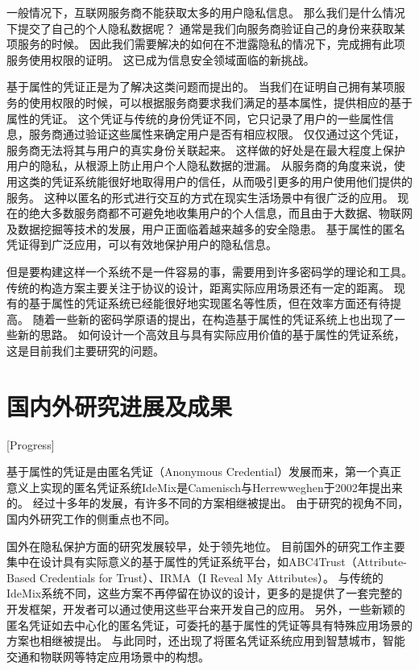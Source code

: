 一般情况下，互联网服务商不能获取太多的用户隐私信息。
那么我们是什么情况下提交了自己的个人隐私数据呢？
通常是我们向服务商验证自己的身份来获取某项服务的时候。
因此我们需要解决的如何在不泄露隐私的情况下，完成拥有此项服务使用权限的证明。
这已成为信息安全领域面临的新挑战。

基于属性的凭证正是为了解决这类问题而提出的。
当我们在证明自己拥有某项服务的使用权限的时候，可以根据服务商要求我们满足的基本属性，提供相应的基于属性的凭证。
这个凭证与传统的身份凭证不同，它只记录了用户的一些属性信息，服务商通过验证这些属性来确定用户是否有相应权限。
仅仅通过这个凭证，服务商无法将其与用户的真实身份关联起来。
这样做的好处是在最大程度上保护用户的隐私，从根源上防止用户个人隐私数据的泄漏。
从服务商的角度来说，使用这类的凭证系统能很好地取得用户的信任，从而吸引更多的用户使用他们提供的服务。
这种以匿名的形式进行交互的方式在现实生活场景中有很广泛的应用。
现在的绝大多数服务商都不可避免地收集用户的个人信息，而且由于大数据、物联网及数据挖掘等技术的发展，用户正面临着越来越多的安全隐患。
基于属性的匿名凭证得到广泛应用，可以有效地保护用户的隐私信息。

但是要构建这样一个系统不是一件容易的事，需要用到许多密码学的理论和工具。
传统的构造方案主要关注于协议的设计，距离实际应用场景还有一定的距离。
现有的基于属性的凭证系统已经能很好地实现匿名等性质，但在效率方面还有待提高。
随着一些新的密码学原语的提出，在构造基于属性的凭证系统上也出现了一些新的思路。
如何设计一个高效且与具有实际应用价值的基于属性的凭证系统，这是目前我们主要研究的问题。

\section{国内外研究进展及成果}[Progress]

基于属性的凭证是由匿名凭证（Anonymous Credential）发展而来，第一个真正意义上实现的匿名凭证系统IdeMix是Camenisch与Herrewweghen于2002年提出来的\cite{camenisch2002design}。
经过十多年的发展，有许多不同的方案相继被提出。
由于研究的视角不同，国内外研究工作的侧重点也不同。

国外在隐私保护方面的研究发展较早，处于领先地位。
目前国外的研究工作主要集中在设计具有实际意义的基于属性的凭证系统平台，如ABC4Trust\cite{sabouri2012attribute}（Attribute-Based Credentials for Trust）、IRMA\cite{vullers2013efficient}（I Reveal My Attributes）。
与传统的IdeMix系统不同，这些方案不再停留在协议的设计，更多的是提供了一套完整的开发框架，开发者可以通过使用这些平台来开发自己的应用。
另外，一些新颖的匿名凭证如去中心化的匿名凭证\cite{garman2014decentralized}，可委托的基于属性的凭证\cite{blomer2018delegatable}等具有特殊应用场景的方案也相继被提出。
与此同时，还出现了将匿名凭证系统应用到智慧城市\cite{de2017assessment}，智能交通\cite{neven2017privacy}和物联网\cite{viejo2019secure}等特定应用场景中的构想。

